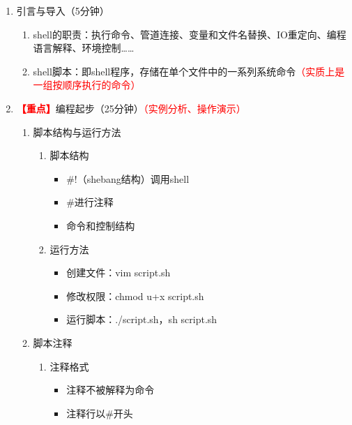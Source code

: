 \documentclass{TIJMUjiaoanLL}
\begin{document}
\firstTail


\newpage
\otherHeader

\begin{enumerate}
  \item 引言与导入（5分钟）
    \begin{enumerate}
      \item shell的职责：执行命令、管道连接、变量和文件名替换、IO重定向、编程语言解释、环境控制……
      \item shell脚本：即shell程序，存储在单个文件中的一系列系统命令\textcolor{red}{（实质上是一组按顺序执行的命令）}
    \end{enumerate}


  \item
    \textcolor{red}{\textbf{【重点】}}编程起步（25分钟）\textcolor{red}{（实例分析、操作演示）}
    \begin{enumerate}
      \item 脚本结构与运行方法
	\vspace*{-10pt}
	\begin{multicols}{2}
	\begin{enumerate}
	  \item 脚本结构
	    \begin{itemize}
	      \item \#!（shebang结构）调用shell
	      \item \#进行注释
	      \item 命令和控制结构
	    \end{itemize}
	  \item 运行方法
	    \begin{itemize}
	      \item 创建文件：vim script.sh
	      \item 修改权限：chmod u+x script.sh
	      \item 运行脚本：./script.sh，sh script.sh
	    \end{itemize}
	\end{enumerate}
	\end{multicols}
	\vspace*{-10pt}
      \item 脚本注释
	\vspace*{-10pt}
	\begin{multicols}{2}
	\begin{enumerate}
	  \item 注释格式
	    \begin{itemize}
	      \item 注释不被解释为命令
	      \item 注释行以\#开头

\end{itemize}
\end{enumerate}
\end{multicols}
\end{enumerate}
\end{enumerate}
\end{document}
